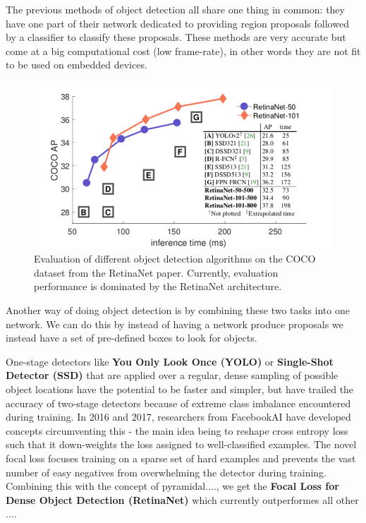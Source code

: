 \documentclass[a4paper]{article}
\begin{document}
The previous methods of object detection all share one thing in common: they have one part of their network dedicated to providing region proposals followed by a classifier to classify these proposals. These methods are very accurate but come at a big computational cost (low frame-rate), in other words they are not fit to be used on embedded devices.
\begin{figure}

\includegraphics[scale=0.32]{retinanet}
\caption{Evaluation of different object detection algorithms on the COCO dataset from the RetinaNet paper. Currently, evaluation performance is dominated by the RetinaNet architecture.}
\end{figure}
Another way of doing object detection is by combining these two tasks into one network. We can do this by instead of having a network produce proposals we instead have a set of pre-defined boxes to look for objects.



One-stage detectors like \textbf{You Only Look Once (YOLO)}\cite{DBLP:journals/corr/RedmonDGF15}\cite{DBLP:journals/corr/RedmonF16}\cite{DBLP:journals/corr/abs-1804-02767} or \textbf{Single-Shot Detector (SSD)}\cite{DBLP:journals/corr/LiuAESR15} that are applied over a regular, dense sampling of possible object locations have the potential to be faster and simpler, but have trailed the accuracy of two-stage detectors because of extreme class imbalance encountered during training.
In 2016 and 2017, researchers from FacebookAI have developed concepts \cite{DBLP:journals/corr/abs-1708-02002}\cite{DBLP:journals/corr/LinDGHHB16}circumventing this - the main idea being to reshape cross entropy loss such that it down-weights the loss assigned to well-classified examples. The novel focal loss focuses training on a sparse set of hard examples and prevents the vast number of easy negatives from overwhelming the detector during training. Combining this with the concept of pyramidal...., we get the \textbf{Focal Loss for Dense Object Detection (RetinaNet)} which currently outperformes all other ....
\end{document}
